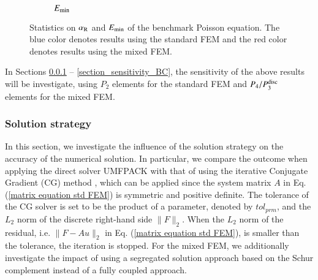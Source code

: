 \documentclass[review,3p]{elsarticle}
\begin{document}
\begin{figure}[!ht]
\begin{subfigure}[b]{0.35\textwidth}
{
}
\vspace{-0.2cm}
\caption{$E_{\rm min}$}
\label{E_min_benchmark_Poisson}
\end{subfigure}
\caption{Statistics on $\alpha_{\rm R}$ and $E_{\rm min}$ of the benchmark Poisson equation. The blue color denotes results using the standard FEM and the red color denotes results using the mixed FEM.}
\label{alpha_R_benchmark}
\end{figure}

In Sections \ref{section_sensitivity_solver} -- \ref{section_sensitivity_BC}, the sensitivity of the above results will be investigate, using $P_2$ elements for the standard FEM and $P_4/P_3^{\rm disc}$ elements for the mixed FEM.

\subsubsection{Solution strategy}		\label{section_sensitivity_solver}

In this section, we investigate the influence of the solution strategy on the accuracy of the numerical solution. In particular, we compare the outcome when applying the direct solver UMFPACK with that of using the iterative Conjugate Gradient (CG) method \cite{ginsburg1963cg}, which can be applied since the system matrix $A$ in Eq. (\ref{matrix equation std FEM}) is symmetric and positive definite. The tolerance of the CG solver is set to be the product of a parameter, denoted by $tol_{prm}$, and the $L_2$ norm of the discrete right-hand side $\|F\|_2$.
When the $L_2$ norm of the residual, i.e. $\|F-Au\|_2$ in Eq. (\ref{matrix equation std FEM}), is smaller than the tolerance, the iteration is stopped.
For the mixed FEM, we additionally investigate the impact of using a segregated solution approach based on the Schur complement instead of a fully coupled approach.
\end{document}

